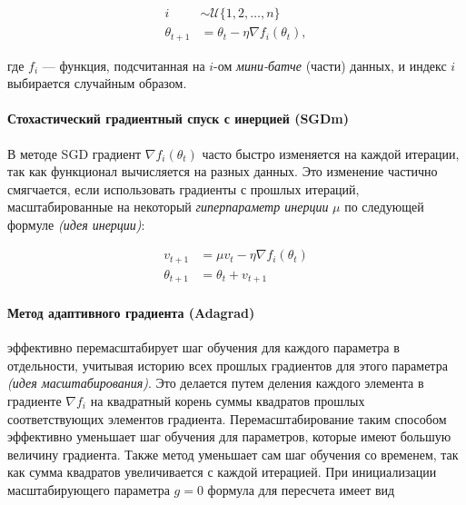 \documentclass[12pt]{article}
\begin{document}
\begin{equation}
\begin{aligned}
i &\sim \mathcal{U}\{1, 2, \ldots, n\}\\
\theta_{t+1} &= \theta_t - \eta \nabla f_i(\theta_t),
\end{aligned}
\end{equation}

где $f_i$ --- функция, подсчитанная на $i$-ом \textit{мини-батче} (части) данных, и индекс $i$ выбирается случайным образом.

\paragraph{Стохастический градиентный спуск с инерцией (SGDm) \cite{momentum}\\}

В методе SGD градиент $\nabla f_i(\theta_t)$ часто быстро изменяется на каждой итерации, так как функционал вычисляется на разных данных. Это изменение частично смягчается, если использовать градиенты с прошлых итераций, масштабированные на некоторый \textit{гиперпараметр инерции} $\mu$ по следующей формуле \textit{(идея инерции)}:


\begin{equation}
\begin{aligned}
v_{t+1} &= \mu v_t - \eta \nabla f_i(\theta_t)\\
\theta_{t+1} &= \theta_t + v_{t+1}
\end{aligned}
\end{equation}


\paragraph{Метод адаптивного градиента (Adagrad) \cite{adagrad}} эффективно перемасштабирует шаг обучения для каждого параметра в отдельности, учитывая историю всех прошлых градиентов для этого параметра \textit{(идея масштабирования)}. Это делается путем деления каждого элемента в градиенте $\nabla f_i$ на квадратный корень суммы квадратов прошлых соответствующих элементов градиента. Перемасштабирование таким способом эффективно уменьшает шаг обучения для параметров, которые имеют большую величину градиента. Также метод уменьшает сам шаг обучения со временем, так как сумма квадратов увеличивается с каждой итерацией. При инициализации масштабирующего параметра $g = 0$ формула для пересчета имеет вид
\end{document}
